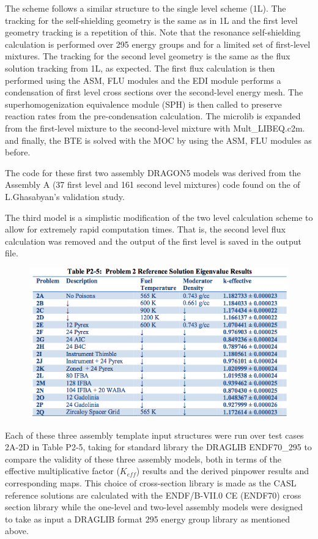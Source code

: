 \documentclass[12pt]{article}
\begin{document}
The scheme follows a similar structure to the single level scheme (1L). The tracking for the self-shielding geometry is the same as in 1L and the first level geometry tracking is a repetition of this. Note that the resonance self-shielding calculation is performed over 295 energy groups and for a limited set of first-level mixtures. The tracking for the second level geometry is the same as the flux solution tracking from 1L, as expected. The first flux calculation is then performed using the ASM, FLU modules and the EDI module performs a condensation of first level cross sections over the second-level energy mesh. The superhomogenization equivalence module (SPH) is then called to preserve reaction rates from the pre-condensation calculation. The microlib is expanded from the first-level mixture to the second-level mixture with Mult\_LIBEQ.c2m. and finally, the BTE is solved with the MOC by using the ASM, FLU modules as before. 

The code for these first two assembly DRAGON5 models was derived from the Assembly A (37 first level and 161 second level mixtures) code found on the \href{https://github.com/tumregels/msca/tree/master/Dragon}{\color{blue}{github page}} of L.Ghasabyan's validation study. \cite{ghasabyan2020validation}

The third model is a simplistic modification of the two level calculation scheme to allow for extremely rapid computation times. That is, the second level flux calculation was removed and the output of the first level is saved in the output file. 

\begin{figure} [htb!]
\centering
\includegraphics[scale=0.7]{Figures/CASL P2 resultsTable.png}
\end{figure}

Each of these three assembly template input structures were run over test cases 2A-2D in Table P2-5, taking for standard library the DRAGLIB ENDF70\_295 to compare the validity of these three assembly models, both in terms of the effective multiplicative factor ($K_{eff}$) results and the derived pinpower results and corresponding maps. This choice of cross-section library is made as the CASL reference solutions are calculated with the ENDF/B-VII.0 CE (ENDF70) cross section library while the one-level and two-level assembly models were designed to take as input a DRAGLIB format 295 energy group library as mentioned above. 
\end{document}
